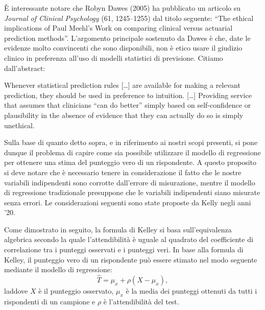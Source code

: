 È interessante notare che Robyn Dawes (2005) ha pubblicato un articolo su \emph{Journal of Clinical Psychology} (61, 1245--1255) dal titolo seguente: \enquote{The ethical implications of Paul Meehl's Work on comparing clinical versus actuarial prediction methods}. 
L'argomento principale sostenuto da Dawes è che, date le evidenze molto convincenti che sono disponibili, non è etico usare il giudizio clinico in preferenza all'uso di modelli statistici di previsione. 
Citiamo dall'abstract:

\begin{displayquote}
Whenever statistical prediction rules [\dots] are available for making a relevant prediction, they should be used in preference to intuition. [\dots] Providing service that assumes that clinicians \enquote{can do better} simply based on self-confidence or plausibility in the absence of evidence that they can actually do so is simply unethical.
\end{displayquote}

Sulla base di quanto detto sopra, e in riferimento ai nostri scopi presenti, si pone dunque il problema di capire come sia possibile utilizzare il modello di regressione per ottenere una stima del punteggio vero di un rispondente.
A questo proposito si deve notare che è necessario tenere in considerazione il fatto che le nostre variabili indipendenti sono corrotte dall'errore di misurazione, mentre  il modello di regressione tradizionale presuppone che le variabili indipendenti siano misurate senza errori.
Le considerazioni seguenti sono state proposte da Kelly negli anni '20.

Come dimostrato in seguito, la formula di Kelley si basa sull'equivalenza algebrica secondo la quale l'attendibilità è uguale al quadrato del coefficiente di correlazione tra i punteggi osservati e i punteggi veri.
In base alla formula di Kelley, il punteggio vero di un rispondente può essere stimato   nel modo seguente mediante il modello di regressione:
\begin{equation}
\hat{T} = \mu_x + \rho  (X - \mu_x),
\label{eq:true_score}
\end{equation}
laddove $X$ è il punteggio osservato, $\mu_x$ è la media dei punteggi ottenuti da tutti i rispondenti di un campione e $\rho$ è l'attendibilità del test. 

